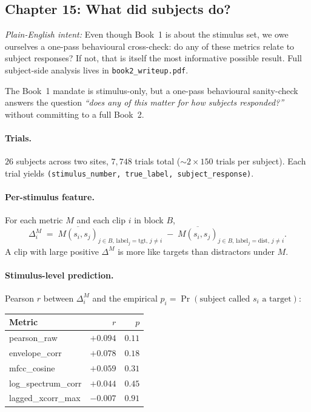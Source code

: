 \documentclass[11pt]{article}
\newcommand{\pintent}[1]{\par\medskip\noindent\textit{Plain-English intent:} #1\par\smallskip}
\begin{document}
\subsection{Chapter 15: What did subjects do?}
\pintent{Even though Book~1 is about the stimulus set, we owe ourselves a
one-pass behavioural cross-check: do any of these metrics relate to subject
responses? If not, that is itself the most informative possible result.
Full subject-side analysis lives in \texttt{book2\_writeup.pdf}.}

The Book~1 mandate is stimulus-only, but a one-pass behavioural
sanity-check answers the question \emph{``does any of this matter for
how subjects responded?''} without committing to a full Book~2.

\paragraph{Trials.}
$26$ subjects across two sites, $7{,}748$ trials total
($\sim 2 \times 150$ trials per subject).  Each trial yields
\texttt{(stimulus\_number, true\_label, subject\_response)}.

\paragraph{Per-stimulus feature.}
For each metric $M$ and each clip $i$ in block $B$,
\[
  \Delta^M_i
  \;=\;
  \overline{M(s_i, s_j)}_{j\in B,\, \text{label}_j = \text{tgt},\, j \ne i}
  \;-\;
  \overline{M(s_i, s_j)}_{j\in B,\, \text{label}_j = \text{dist},\, j \ne i}.
\]
A clip with large positive $\Delta^M$ is more like targets than
distractors under $M$.

\paragraph{Stimulus-level prediction.}
Pearson $r$ between $\Delta^M_i$ and the empirical
$p_i = \Pr(\text{subject called } s_i \text{ a target})$:

\begin{table}[H]
\centering
\begin{tabular}{lrr}
\toprule
Metric & $r$ & $p$ \\
\midrule
pearson\_raw        & $+0.094$ & $0.11$ \\
envelope\_corr      & $+0.078$ & $0.18$ \\
mfcc\_cosine        & $+0.059$ & $0.31$ \\
log\_spectrum\_corr & $+0.044$ & $0.45$ \\
lagged\_xcorr\_max  & $-0.007$ & $0.91$ \\
\bottomrule
\end{tabular}
\end{table}
\end{document}
